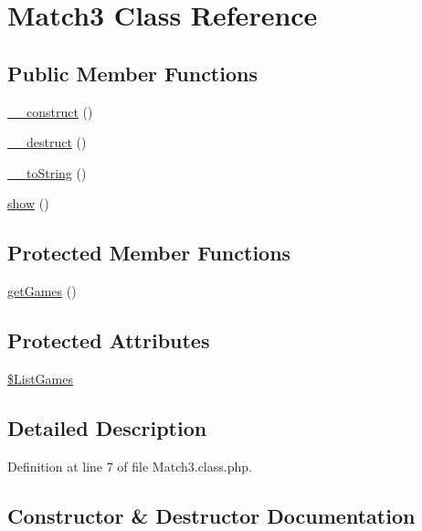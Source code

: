 \hypertarget{class_match3}{}\section{Match3 Class Reference}
\label{class_match3}
\subsection*{Public Member Functions}
\begin{DoxyCompactItemize}
\item 
\hyperlink{class_match3_ab34dd7d72e1050a177bb0bbbcc285874}{\+\_\+\+\_\+construct} ()
\item 
\hyperlink{class_match3_aa5ebf7b6edc24f6f7568d30c5f170cab}{\+\_\+\+\_\+destruct} ()
\item 
\hyperlink{class_match3_a4aca8a2d842e41c176c3706347d6810b}{\+\_\+\+\_\+to\+String} ()
\item 
\hyperlink{class_match3_ae0c380ef50af1cfe343153b991ba18a7}{show} ()
\end{DoxyCompactItemize}
\subsection*{Protected Member Functions}
\begin{DoxyCompactItemize}
\item 
\hyperlink{class_match3_a5dc643e8436769e17857bdb2eb5b609e}{get\+Games} ()
\end{DoxyCompactItemize}
\subsection*{Protected Attributes}
\begin{DoxyCompactItemize}
\item 
\hyperlink{class_match3_adae3adab0254e708f802789cf60c12de}{\$\+List\+Games}
\end{DoxyCompactItemize}


\subsection{Detailed Description}


Definition at line 7 of file Match3.\+class.\+php.



\subsection{Constructor \& Destructor Documentation}
\mbox{\label{class_match3_ab34dd7d72e1050a177bb0bbbcc285874}} 
